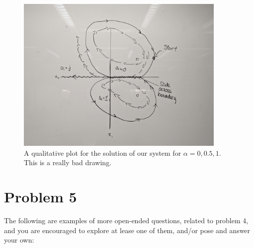 \jump
\begin{figure}[!ht]
\centering
\includegraphics[width = 0.9\textwidth]{Images/qualitative plot.jpg}
\caption{A qualitative plot for the solution of our system for $\alpha = 0, 0.5, 1$. This is a really bad drawing. }
\label{png:qualitativeplot}
\end{figure}


\vspace{\floatsep}
\clearpage

\newpage
\section{Problem 5}
The following are examples of more open-ended questions, related to problem 4, and you are encouraged to explore at lease one of them, and/or pose and answer your own:

